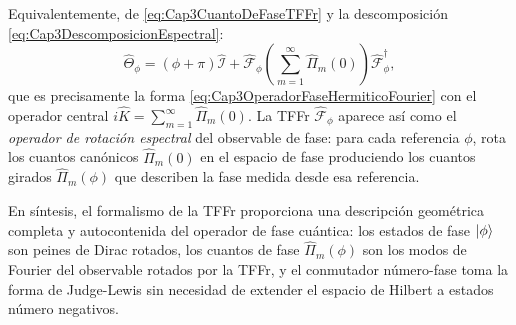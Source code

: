                 Equivalentemente, de \ref{eq:Cap3CuantoDeFaseTFFr} y la descomposición \ref{eq:Cap3DescomposicionEspectral}:
                \begin{equation}
                    \hat{\Theta}_\phi = (\phi+\pi)\hat{\mathcal{I}} + \hat{\mathcal{F}}_\phi\left(\sum_{m=1}^{\infty}\hat{\Pi}_m(0)\right)\hat{\mathcal{F}}_\phi^\dagger,
                \end{equation}
                que es precisamente la forma \ref{eq:Cap3OperadorFaseHermiticoFourier} con el operador central $i\hat{K}=\sum_{m=1}^{\infty}\hat{\Pi}_m(0)$. La TFFr $\hat{\mathcal{F}}_\phi$ aparece así como el \textit{operador de rotación espectral} del observable de fase: para cada referencia $\phi$, rota los cuantos canónicos $\hat{\Pi}_m(0)$ en el espacio de fase produciendo los cuantos girados $\hat{\Pi}_m(\phi)$ que describen la fase medida desde esa referencia.

                En síntesis, el formalismo de la TFFr proporciona una descripción geométrica completa y autocontenida del operador de fase cuántica: los estados de fase $\ket{\phi}$ son peines de Dirac rotados, los cuantos de fase $\hat{\Pi}_m(\phi)$ son los modos de Fourier del observable rotados por la TFFr, y el conmutador número-fase toma la forma de Judge-Lewis sin necesidad de extender el espacio de Hilbert a estados número negativos.

